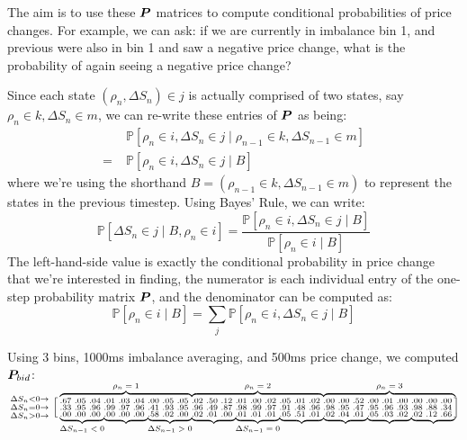 The aim is to use these $\boldsymbol{P}$ matrices to compute conditional probabilities of price changes. For example, we can ask: if we are currently in imbalance bin 1, and previous were also in bin 1 and saw a negative price change, what is the probability of again seeing a negative price change?

Since each state $(\rho_n, \Delta S_n) \in j$ is actually comprised of two states, say $\rho_n \in k, \Delta S_n \in m$, we can re-write these entries of $\boldsymbol{P}$ as being:
\begin{align*}
& \mathbb{P}\left[ \rho_n \in i, \Delta S_n \in j \; | \; \rho_{n-1} \in k, \Delta S_{n-1} \in m \right] \\
=\;  & \mathbb{P}\left[ \rho_n \in i, \Delta S_n \in j \; | \; B \right]
\end{align*}
where we're using the shorthand $B = (\rho_{n-1} \in k, \Delta S_{n-1} \in m)$ to represent the states in the previous timestep. Using Bayes' Rule, we can write:
$$ \mathbb{P}\left[ \Delta S_n \in j \; | \; B, \rho_n \in i \right] = \dfrac{\mathbb{P}\left[ \rho_n \in i, \Delta S_n \in j \; | \; B \right]}{\mathbb{P}\left[ \rho_n \in i \; | \; B \right]} $$
The left-hand-side value is exactly the conditional probability in price change that we're interested in finding, the numerator is each individual entry of the one-step probability matrix $\boldsymbol{P}$, and the denominator can be computed as:
$$\mathbb{P}\left[ \rho_n \in i \; | \; B \right] = \sum\limits_j \mathbb{P}\left[ \rho_n \in i,  \Delta S_n \in j \; | \; B \right]$$

Using 3 bins, 1000ms imbalance averaging, and 500ms price change, we computed $\boldsymbol{P}_{bid}$:

$$  \begin{smallmatrix}
    \Delta S_n < 0 \rightarrow \\
    \Delta S_n = 0 \rightarrow \\
    \Delta S_n > 0 \rightarrow
  \end{smallmatrix}
  \left [
    \begin{smallmatrix}
\overmat{\rho_n = 1}{.67 & .05 & .04 & .01 & .03 & .04 & .00 & .05 & .05} & \overmat{\rho_n = 2}{.02 & .50 & .12 & .01 & .00 & .02 & .05 & .01 & .02} & 
\overmat{\rho_n = 3}{.00 & .00 & .52 & .00 & .01 & .00 & .00 & .00 & .00} \\
.33 & .95 & .96 & .99 & .97 & .96 & .41 & .93 & .95 & .96 & .49 & .87 & .98 & .99 & .97 & .91 & .48 & .96 & .98 & .95 & .47 & .95 & .96 & .93 & .98 & .88 & .34 \\ \undermat{\Delta S_{n-1} < 0}{.00 & .00 & .00} & 
\undermat{}{.00 & .00 & .00} & 
\undermat{\Delta S_{n-1} > 0}{.58 & .02 & .00} & 
\undermat{}{.02 & .01 & .00} & 
\undermat{\Delta S_{n-1} = 0}{.01 & .01 & .01} & 
\undermat{}{.05 & .51 & .01} & 
\undermat{}{.02 & .04 & .01} & 
\undermat{}{.05 & .03 & .02} & 
\undermat{}{.02 & .12 & .66}
    \end{smallmatrix}
  \right ]
$$

